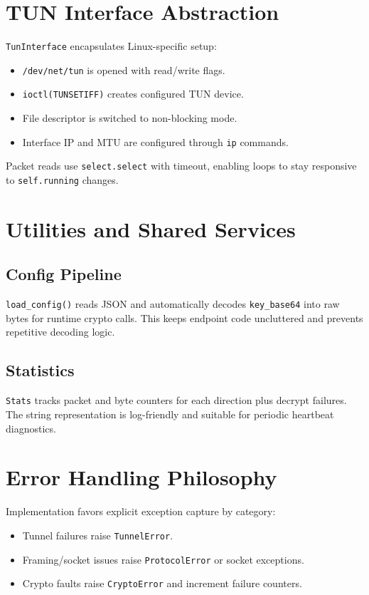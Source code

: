 \section{TUN Interface Abstraction}
\texttt{TunInterface} encapsulates Linux-specific setup:
\begin{itemize}[leftmargin=2em]
\item \texttt{/dev/net/tun} is opened with read/write flags.
\item \texttt{ioctl(TUNSETIFF)} creates configured TUN device.
\item File descriptor is switched to non-blocking mode.
\item Interface IP and MTU are configured through \texttt{ip} commands.
\end{itemize}

Packet reads use \texttt{select.select} with timeout, enabling loops to stay responsive to \texttt{self.running} changes.

\section{Utilities and Shared Services}
\subsection{Config Pipeline}
\texttt{load\_config()} reads JSON and automatically decodes \texttt{key\_base64} into raw bytes for runtime crypto calls. This keeps endpoint code uncluttered and prevents repetitive decoding logic.

\subsection{Statistics}
\texttt{Stats} tracks packet and byte counters for each direction plus decrypt failures. The string representation is log-friendly and suitable for periodic heartbeat diagnostics.

\section{Error Handling Philosophy}
Implementation favors explicit exception capture by category:
\begin{itemize}[leftmargin=2em]
\item Tunnel failures raise \texttt{TunnelError}.
\item Framing/socket issues raise \texttt{ProtocolError} or socket exceptions.
\item Crypto faults raise \texttt{CryptoError} and increment failure counters.
\end{itemize}

